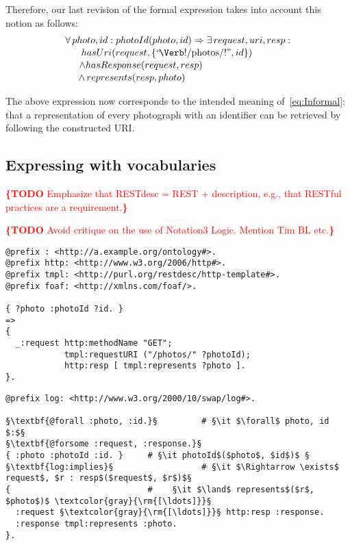 \documentclass[runningheads,a4paper, twocolumn]{llncs}
\newcommand{\todo}[1]{\noindent\textcolor{red}{{\bf \{TODO} #1{\bf \}}}}
\begin{document}
Therefore, our last revision of the formal expression takes into account this notion as follows:
\begin{multline}\label{eq:Formal}
	\makebox[7.8cm]{$\forall\, photo, id : photoId(photo, id) \Rightarrow
					\exists\, request, uri, resp :$}\\[-.2em]
	\shoveleft{hasUri(request, \{\mbox{``\!\Verb!/photos/!''}, id\})} \\[-.2em]
	\shoveleft{\land hasResponse(request, resp)} \\[-.2em]
	\land\, represents(resp, photo)\makebox[3.38cm]{}
\end{multline}

The above expression now corresponds to the intended meaning of~\ref{eq:Informal}: that a representation of every photograph with an identifier can be retrieved by following the constructed URI.

\subsection{Expressing with vocabularies}

\todo{Emphasize that RESTdesc = REST + description, e.g., that RESTful practices are a requirement.}

\todo{Avoid critique on the use of Notation3 Logic. Mention Tim BL etc.}


\begin{lstlisting}[caption=RESTdesc description of photo retrieval,
                   label=lst:PhotoGet, float, escapechar=§]
@prefix : <http://a.example.org/ontology#>.
@prefix http: <http://www.w3.org/2006/http#>.
@prefix tmpl: <http://purl.org/restdesc/http-template#>.
@prefix foaf: <http://xmlns.com/foaf/>.

{ ?photo :photoId ?id. }
=>
{
  _:request http:methodName "GET";
            tmpl:requestURI ("/photos/" ?photoId);
            http:resp [ tmpl:represents ?photo ].
}.
\end{lstlisting}

\begin{lstlisting}[caption=\autoref{lst:PhotoGet} with explicit quantifiers,
                   label=lst:PhotoGetQuantifiers, float, escapechar=§]
@prefix log: <http://www.w3.org/2000/10/swap/log#>.

§\textbf{@forall :photo, :id.}§         # §\it $\forall$ photo, id $:$§
§\textbf{@forsome :request, :response.}§
{ :photo :photoId :id. }     # §\it photoId$($photo$, $id$)$ §
§\textbf{log:implies}§                  # §\it $\Rightarrow \exists$ request$, $r : resp$($request$, $r$)$§
{                            #    §\it $\land$ represents$($r$, $photo$)$ \textcolor{gray}{\rm{[\ldots]}}§
  :request §\textcolor{gray}{\rm{[\ldots]}}§ http:resp :response.
  :response tmpl:represents :photo.
}.
\end{lstlisting}
\end{document}
